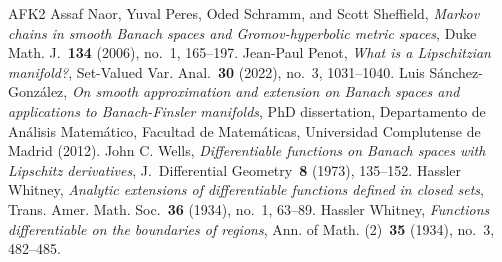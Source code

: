 \documentclass[a4paper,twoside,10pt,reqno,draft]{amsart}
\theoremstyle{definition}
\theoremstyle{remark}
\begin{document}
\begin{thebibliography}{AFK2}
%
Assaf Naor, Yuval Peres, Oded Schramm, and Scott Sheffield,
\emph{Markov chains in smooth Banach spaces and Gromov-hyperbolic metric spaces},
Duke Math. J.~\textbf{134} (2006), no.~1, 165--197.
%
Jean-Paul Penot,
\emph{What is a Lipschitzian manifold?},
Set-Valued Var. Anal.~\textbf{30} (2022), no.~3, 1031--1040.
%
%
Luis Sánchez-González,
\emph{On smooth approximation and extension on Banach spaces and applications to Banach-Finsler manifolds},
PhD dissertation, Departamento de Análisis Matemático, Facultad de Matemáticas, Universidad Complutense de Madrid (2012).
%
John C. Wells,
\emph{Differentiable functions on Banach spaces with Lipschitz derivatives},
J.~Differential Geometry~\textbf{8} (1973), 135--152.
%
Hassler Whitney,
\emph{Analytic extensions of differentiable functions defined in closed sets},
Trans. Amer. Math. Soc.~\textbf{36} (1934), no.~1, 63--89.
%
Hassler Whitney,
\emph{Functions differentiable on the boundaries of regions},
Ann. of Math. (2)~\textbf{35} (1934), no.~3, 482--485.
\end{thebibliography}
\end{document}
